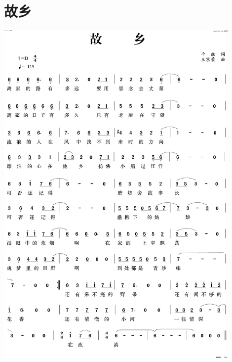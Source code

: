 \documentclass[cn,pad,twocol]{elegantbook}
\begin{document}
\section{故乡} \includegraphics[width=0.9\textwidth]{macos/20210208故乡.jpg}
\end{document}

